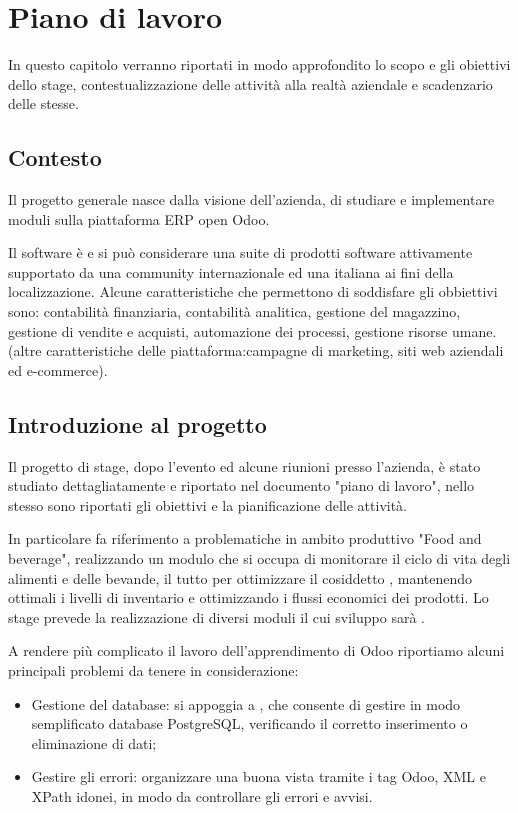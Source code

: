 
\hypertarget{(chap:capitolo2)}{}
\chapter{Piano di lavoro}
In questo capitolo verranno riportati in modo approfondito lo scopo e gli obiettivi dello stage, contestualizzazione delle attività alla realtà aziendale e scadenzario delle stesse.

\section{Contesto}
Il progetto generale nasce dalla visione dell'azienda, di studiare e implementare moduli sulla piattaforma ERP open Odoo.

Il software è  e si può considerare una suite di prodotti software attivamente supportato da una community internazionale ed una italiana ai fini della localizzazione.
Alcune caratteristiche che permettono di soddisfare gli obbiettivi sono: contabilità finanziaria, contabilità analitica, gestione del magazzino, gestione di vendite e acquisti, automazione dei processi, gestione risorse umane. (altre caratteristiche delle piattaforma:campagne di marketing, siti web aziendali ed e-commerce).

\section{Introduzione al progetto}
Il progetto di stage, dopo l'evento  ed alcune riunioni presso l'azienda, è stato studiato dettagliatamente e riportato nel documento "piano di lavoro", nello stesso sono riportati gli obiettivi e la pianificazione delle attività.

In particolare fa riferimento a problematiche in ambito produttivo "Food and beverage", realizzando un modulo che si occupa di monitorare il ciclo di vita degli alimenti e delle bevande, il tutto per ottimizzare il cosiddetto , mantenendo ottimali i livelli di inventario e ottimizzando i flussi economici dei prodotti.
Lo stage prevede la realizzazione di diversi moduli il cui sviluppo sarà .

A rendere più complicato il lavoro dell'apprendimento di Odoo riportiamo alcuni principali problemi da tenere in considerazione:
\begin{itemize}
	\item Gestione del database: si appoggia a , che consente di gestire in modo semplificato database PostgreSQL, verificando il corretto inserimento o eliminazione di dati;
	\item Gestire gli errori: organizzare una buona vista tramite i tag Odoo, XML e XPath idonei, in modo da controllare gli errori e avvisi.
\end{itemize}

